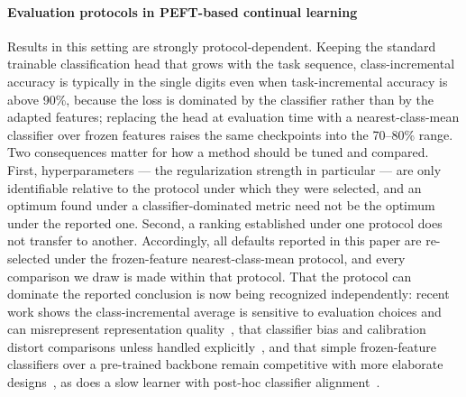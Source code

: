 \paragraph{Evaluation protocols in PEFT-based continual learning}
Results in this setting are strongly protocol-dependent. Keeping the standard trainable
classification head that grows with the task sequence, class-incremental accuracy is
typically in the single digits even when task-incremental accuracy is above 90\%, because
the loss is dominated by the classifier rather than by the adapted features; replacing the
head at evaluation time with a nearest-class-mean classifier over frozen features raises
the same checkpoints into the 70--80\% range. Two consequences matter for how a method
should be tuned and compared. First, hyperparameters --- the regularization strength in
particular --- are only identifiable relative to the protocol under which they were
selected, and an optimum found under a classifier-dominated metric need not be the optimum
under the reported one. Second, a ranking established under one protocol does not transfer
to another. Accordingly, all defaults reported in this paper are re-selected under the
frozen-feature nearest-class-mean protocol, and every comparison we draw is made within
that protocol. That the protocol can dominate the reported conclusion is now being
recognized independently: recent work shows the class-incremental average is sensitive to
evaluation choices and can misrepresent representation
quality~\cite{lai2026lieaverage,cha2025diverseeval,lee2026mega}, that classifier bias and
calibration distort comparisons unless handled
explicitly~\cite{pomponi2025dampening,zhang2026confidence}, and that simple
frozen-feature classifiers over a pre-trained backbone remain competitive with more
elaborate designs~\cite{mcdonnell2023ranpac,castellana2026cdimm,tran2026convexhull}, as
does a slow learner with post-hoc classifier alignment~\cite{zhang2023slca}.

